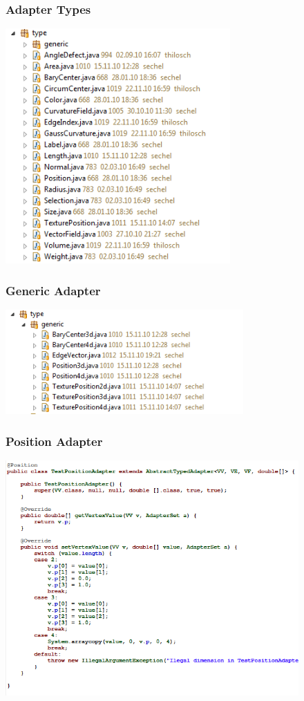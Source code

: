 \documentclass[12pt]{beamer}
\begin{document}
\begin{frame}
\frametitle{Adapter Types}
\begin{center}
\includegraphics[height=9cm]{adaptertypes.png}\\	
\end{center}
\end{frame}

\begin{frame}
\frametitle{Generic Adapter}
\begin{center}
\includegraphics[height=4cm]{genericadapters.png}\\	
\end{center}
\end{frame}

\begin{frame}
\frametitle{Position Adapter}
\begin{center}
\includegraphics[height=9cm]{testadapter.png}\\	
\end{center}
\end{frame}
\end{document}
